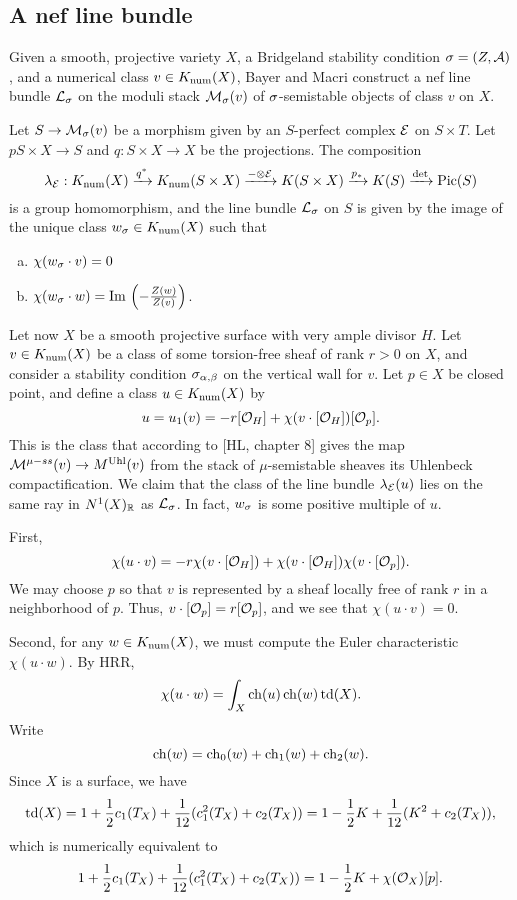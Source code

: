 \documentclass[letterpaper,10pt]{article}
\begin{document}
\subsection{A nef line bundle}
Given a smooth, projective variety $X$, a Bridgeland stability condition $\sigma = (Z, \mathcal{A})$, and a numerical class $v \in K_{\mathrm{num}}(X)$, Bayer and Macri construct a nef line bundle $\mathcal{L}_\sigma$ on the moduli stack $\mathcal{M}_\sigma(v)$ of $\sigma$-semistable objects of class $v$ on $X$.

Let $S \to \mathcal{M}_\sigma(v)$ be a morphism given by an $S$-perfect complex $\mathcal{E}$ on $S \times T$. Let $p S \times X \to S$ and $q: S \times X \to X$ be the projections. The composition
\[ \lambda_{\mathcal{E}}: K_{\mathrm{num}}(X) \xrightarrow{q^*} K_{\mathrm{num}}(S \times X) \xrightarrow{- \otimes \mathcal{E}} K(S \times X) \xrightarrow{p_*} K(S) \xrightarrow{\det} \mathrm{Pic}(S) \]
is a group homomorphism, and the line bundle $\mathcal{L}_\sigma$ on $S$ is given by the image of the unique class $w_\sigma \in K_{\mathrm{num}}(X)$ such that
\begin{enumerate}[(a)]
    \item $\chi(w_\sigma \cdot v) = 0$
    \item $\chi(w_\sigma \cdot w) = \mathrm{Im}\,\left(-\frac{Z(w)}{Z(v)}\right)$.
\end{enumerate}

Let now $X$ be a smooth projective surface with very ample divisor $H$. Let $v \in K_{\mathrm{num}}(X)$ be a class of some torsion-free sheaf of rank $r > 0$ on $X$, and consider a stability condition $\sigma_{\alpha, \beta}$ on the vertical wall for $v$. Let $p \in X$ be closed point, and define a class $u \in K_{\mathrm{num}}(X)$ by
\[ u = u_1(v) = -r[\mathcal{O}_H] + \chi(v\cdot[\mathcal{O}_H]) [\mathcal{O}_p]. \]
This is the class that according to [HL, chapter 8] gives the map $\mathcal{M}^{\mu-ss}(v) \to M^{\mathrm{Uhl}}(v)$ from the stack of $\mu$-semistable sheaves its Uhlenbeck compactification. We claim that the class of the line bundle $\lambda_{\mathcal{E}}(u)$ lies on the same ray in $N^1(X)_{\mathbb{R}}$ as $\mathcal{L}_\sigma$. In fact, $w_\sigma$ is some positive multiple of $u$.

First,
\[ \chi(u \cdot v) = -r \chi(v \cdot [\mathcal{O}_H]) + \chi(v \cdot [\mathcal{O}_H]) \chi(v \cdot [\mathcal{O}_p]). \]
We may choose $p$ so that $v$ is represented by a sheaf locally free of rank $r$ in a neighborhood of $p$. Thus, $v \cdot [\mathcal{O}_p] = r [\mathcal{O}_p]$, and we see that $\chi(u \cdot v) = 0$.

Second, for any $w \in K_{\mathrm{num}}(X)$, we must compute the Euler characteristic $\chi(u \cdot w)$. By HRR,
\[ \chi(u \cdot w) = \int_X \operatorname{\mathrm{ch}}(u) \operatorname{\mathrm{ch}}(w) \operatorname{\mathrm{td}}(X). \]
Write
\[ \operatorname{\mathrm{ch}}(w) = \operatorname{\mathrm{ch}}_0(w) + \operatorname{\mathrm{ch}}_1(w) + \operatorname{\mathrm{ch}}_2(w). \]
Since $X$ is a surface, we have
\[ \operatorname{\mathrm{td}}(X) = 1 + \frac{1}{2} c_1(T_X) + \frac{1}{12}(c_1^2(T_X) + c_2(T_X)) = 1 - \frac{1}{2} K + \frac{1}{12}(K^2 + c_2(T_X)), \]
which is numerically equivalent to
\[ 1 + \frac{1}{2} c_1(T_X) + \frac{1}{12}(c_1^2(T_X) + c_2(T_X)) = 1 - \frac{1}{2} K + \chi(\mathcal{O}_X) [p]. \]
\end{document}
